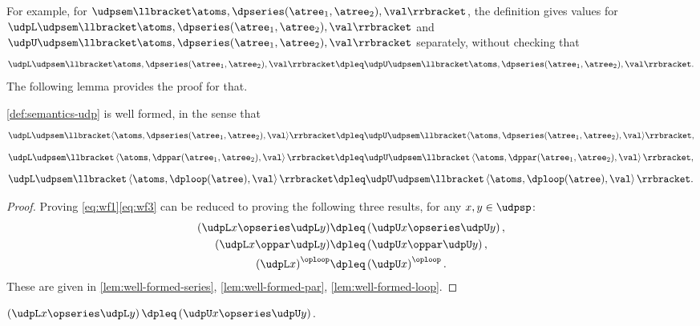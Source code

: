 For example, for $\udpsem\llbracket\atoms,\dpseries(\atree_{1},\atree_{2}),\val\rrbracket$,
the definition gives values for~$\udpL\udpsem\llbracket\atoms,\dpseries(\atree_{1},\atree_{2}),\val\rrbracket$
and~$\udpU\udpsem\llbracket\atoms,\dpseries(\atree_{1},\atree_{2}),\val\rrbracket$
separately, without checking that
\[
	\udpL\udpsem\llbracket\atoms,\dpseries(\atree_{1},\atree_{2}),\val\rrbracket\dpleq\udpU\udpsem\llbracket\atoms,\dpseries(\atree_{1},\atree_{2}),\val\rrbracket.
\]
The following lemma provides the proof for that.
\begin{lemma}
	\label{lem:udpsem-well-formed}\cref{def:semantics-udp} is well
	formed, in the sense that {\small{}
			\begin{equation}
				\udpL\udpsem\llbracket\langle\atoms,\dpseries(\atree_{1},\atree_{2}),\val\rangle\rrbracket\dpleq\udpU\udpsem\llbracket\langle\atoms,\dpseries(\atree_{1},\atree_{2}),\val\rangle\rrbracket,\label{eq:wf1}
			\end{equation}
			\begin{equation}
				\udpL\udpsem\llbracket\left\langle \atoms,\dppar(\atree_{1},\atree_{2}),\val\right\rangle \rrbracket\dpleq\udpU\udpsem\llbracket\left\langle \atoms,\dppar(\atree_{1},\atree_{2}),\val\right\rangle \rrbracket,\label{eq:wf2}
			\end{equation}
			\begin{equation}
				\udpL\udpsem\llbracket\left\langle \atoms,\dploop(\atree),\val\right\rangle \rrbracket\dpleq\udpU\udpsem\llbracket\left\langle \atoms,\dploop(\atree),\val\right\rangle \rrbracket.\label{eq:wf3}
			\end{equation}
		}{\small \par}
\end{lemma}
\begin{proof}
	Proving \cref{eq:wf1}\textemdash \cref{eq:wf3} can be
	reduced to proving the following three results, for any $x,y\in\udpsp$:
	\begin{align*}
		\left(\udpL x\opseries\udpL y\right) & \dpleq\left(\udpU x\opseries\udpU y\right), \\
		\left(\udpL x\oppar\udpL y\right)    & \dpleq\left(\udpU x\oppar\udpU y\right),    \\
		\left(\udpL x\right)^{\oploop}       & \dpleq\left(\udpU x\right)^{\oploop}.
	\end{align*}
	These are given in \cref{lem:well-formed-series}, \cref{lem:well-formed-par},
	\cref{lem:well-formed-loop}.
\end{proof}
\begin{lemma}
	\label{lem:well-formed-series}$\left(\udpL x\opseries\udpL y\right)\dpleq\left(\udpU x\opseries\udpU y\right)$.
\end{lemma}
